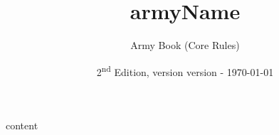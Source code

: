 \documentclass[12pt]{article}
\begin{document}
\title{ {{ armyName }} }
\author{Army Book (Core Rules)}
\date{2\textsuperscript{nd} Edition, version \the\year{} {{ version }} - \today}

{{ content }}
\end{document}
